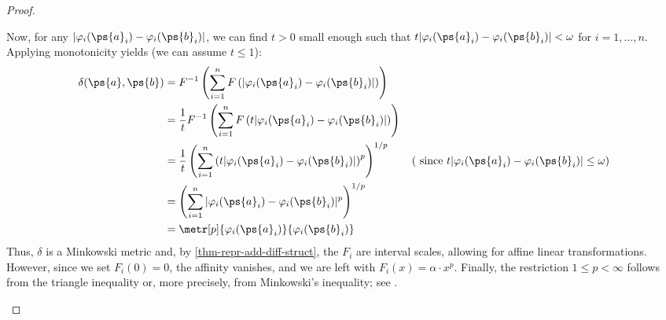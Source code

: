 \begin{proof}
	\begin{proofpart}
		Now, for any $|\varphi_i(\ps{a}_i) - \varphi_i(\ps{b}_i)|$, we can find $t > 0$ small enough such that $t|\varphi_i(\ps{a}_i) - \varphi_i(\ps{b}_i)| < \omega$ for $i = 1, \ldots, n$. Applying monotonicity yields (we can assume $t \leq 1$):
		\begin{align*}
			\delta(\ps{a}, \ps{b}) & = F^{-1} \left( \sum_{i=1}^{n} F \left( |\varphi_i(\ps{a}_i) - \varphi_i(\ps{b}_i)| \right) \right)                                                                                      \\
			                       & = \frac{1}{t} F^{-1} \left( \sum_{i=1}^{n} F \left( t |\varphi_i(\ps{a}_i) - \varphi_i(\ps{b}_i)| \right) \right)                                                                        \\
			                       & = \frac{1}{t} \left( \sum_{i=1}^{n} \left( t|\varphi_i(\ps{a}_i) - \varphi_i(\ps{b}_i)| \right)^p \right)^{1/p} \tag{ since $t |\varphi_i(\ps{a}_i) - \varphi_i(\ps{b}_i)| \leq \omega$} \\
			                       & = \left( \sum_{i=1}^{n} |\varphi_i(\ps{a}_i) - \varphi_i(\ps{b}_i)|^p \right)^{1/p}                                                                                                      \\
			                       & = \metr[p]{\varphi_i(\ps{a}_i)}{\varphi_i(\ps{b}_i)}
		\end{align*}
		Thus, $\delta$ is a Minkowski metric and, by \cref{thm-repr-add-diff-struct}, the $F_i$ are interval scales, allowing for affine linear transformations. However, since we set $F_i(0)=0$, the affinity vanishes, and we are left with $F_i(x)= \alpha \cdot x^p$. Finally, the restriction $1 \leq p < \infty$ follows from the triangle inequality or, more precisely, from Minkowski's inequality; see \parencite[p. 189-191 Theorem 9]{handbookMeans}.
	\end{proofpart}
\end{proof}

